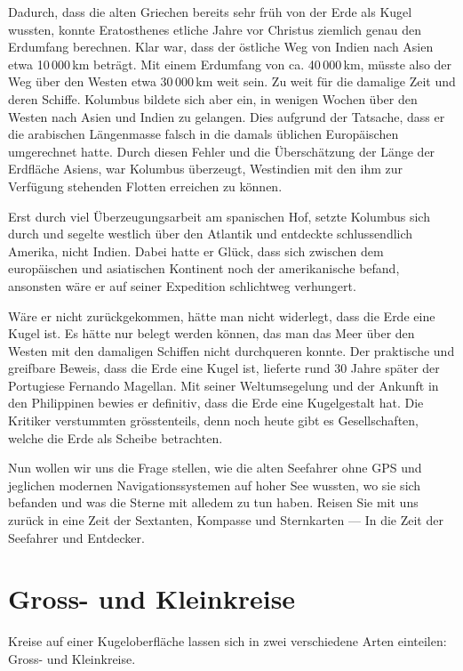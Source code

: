 \begin{refsection}
Dadurch, dass die alten Griechen bereits sehr früh von der Erde als
Kugel wussten, konnte Eratosthenes etliche Jahre vor Christus
ziemlich genau den Erdumfang berechnen. Klar war, dass der östliche
Weg von Indien nach Asien etwa 10\,000\,km beträgt. Mit einem
Erdumfang von ca. 40\,000\,km, müsste also der Weg über den Westen
etwa 30\,000\,km weit sein.
Zu weit für die damalige Zeit und deren Schiffe. Kolumbus bildete
sich aber ein, in wenigen Wochen über den Westen nach Asien und
Indien zu gelangen. Dies aufgrund der Tatsache, dass er die arabischen
Längenmasse falsch in die damals üblichen Europäischen umgerechnet
hatte.
Durch diesen Fehler und die Überschätzung der Länge der Erdfläche
Asiens, war Kolumbus überzeugt, Westindien mit den ihm zur Verfügung
stehenden Flotten erreichen zu können.

Erst durch viel Überzeugungsarbeit am spanischen Hof, setzte Kolumbus
sich  durch und segelte westlich über den Atlantik und entdeckte
schlussendlich Amerika, nicht Indien.
Dabei hatte er Glück, dass sich zwischen dem europäischen und
asiatischen Kontinent noch der amerikanische befand, ansonsten wäre
er auf seiner Expedition schlichtweg verhungert.

Wäre er nicht zurückgekommen, hätte man nicht widerlegt, dass die
Erde eine Kugel ist. Es hätte nur belegt werden können, das man das
Meer über den Westen mit den damaligen Schiffen nicht durchqueren
konnte.
Der praktische und greifbare Beweis, dass die Erde eine Kugel ist,
lieferte rund 30 Jahre später der Portugiese Fernando Magellan. Mit
seiner Weltumsegelung und der Ankunft in den Philippinen bewies er
definitiv, dass die Erde eine Kugelgestalt hat. Die Kritiker
verstummten grösstenteils, denn noch heute gibt es Gesellschaften,
welche die Erde als Scheibe betrachten.

Nun wollen wir uns die Frage stellen, wie die alten Seefahrer ohne
GPS und jeglichen modernen Navigationssystemen auf hoher See wussten,
wo sie sich befanden und was die Sterne mit alledem zu tun haben.
Reisen Sie mit uns zurück in eine Zeit der Sextanten, Kompasse und
Sternkarten --- In die Zeit der Seefahrer und Entdecker.


\section{Gross- und Kleinkreise}
Kreise auf einer Kugeloberfläche lassen sich in zwei verschiedene
Arten einteilen: Gross- und Kleinkreise.


\end{refsection}
